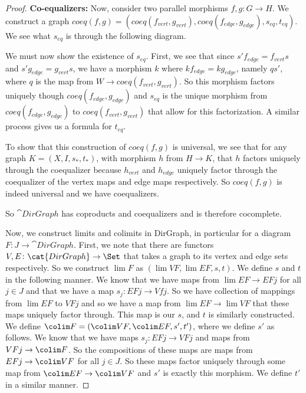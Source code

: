 \documentclass[main.tex]{subfiles}
\begin{document}
\begin{proof}
\textbf{Co-equalizers:} Now, consider two parallel morphisms $f,g\colon G
\rightarrow H$. We construct a graph $coeq(f,g) = (coeq(f_{vert},g_{vert}),
coeq(f_{edge},g_{edge}), s_{eq},t_{eq})$. We see what $s_{eq}$ is through the
following diagram.

We must now show the existence of $s_{eq}$. First, we see that since $s'f_{edge}=f_{vert}s $ and $s'g_{edge}=g_{vert}s$, we have a morphism $k$ where $kf_{edge} = kg_{edge}$, namely $qs'$, where $q$ is the map from $W \rightarrow coeq(f_{vert}, g_{vert})$. So this morphism factors uniquely though $coeq(f_{edge}, g_{edge})$ and $s_{eq}$ is the unique morphism from $coeq(f_{edge}, g_{edge})$ to $coeq(f_{vert}, g_{vert})$ that allow for this factorization. A similar process gives us a formula for $t_{eq}$.

To show that this construction of $coeq(f,g)$ is universal, we see that for any
graph $K = (X, I, s_*, t_*)$, with morphism $h$ from $H \rightarrow K$, that
$h$ factors uniquely through the coequalizer because $h_{vert}$ and $h_{edge}$
uniquely factor through the coequalizer of the vertex maps and edge maps
respectively. So $coeq(f,g)$ is indeed universal and we have coequalizers.

So $\cat{DirGraph}$ has coproducts and coequalizers and is therefore cocomplete.

Now, we construct limits and colimits in \textsf{DirGraph}, in particular for a
diagram $F\colon J \rightarrow \cat{DirGraph}$. First, we note that there are
functors $V,E\colon \cat{DirGraph} \rightarrow \Set$ that takes a graph to its
vertex and edge sets respectively. So we construct $\lim F$ as $(\lim VF, \lim
EF, s,t)$. We define $s$ and $t$ in the following manner. We know that we have
maps from $\lim EF \rightarrow EFj$ for all $j \in J$ and that we have a map
$s_j: EFj \rightarrow Vfj$. So we have collection of mappings from $\lim EF$ to
$VFj$ and so we have a map from $\lim EF \rightarrow \lim VF$ that these maps
uniquely factor through. This map is our $s$, and $t$ is similarly constructed.
We define $\colim F = (\colim VF, \colim EF, s',t')$, where we define $s'$ as
follows. We know that we have maps $s_j\colon EFj \rightarrow VFj$ and maps from
$VFj \rightarrow \colim F$. So the compositions of these maps are maps from
$EFj \rightarrow \colim VF$ for all $j \in J$. So these maps factor uniquely
through some map from $\colim EF \rightarrow \colim VF$ and $s'$ is exactly
this morphism. We define $t'$ in a similar manner.
\end{proof}
\end{document}
